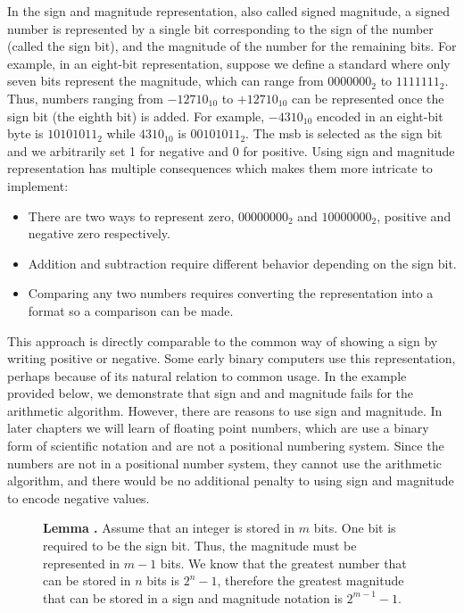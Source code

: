 \documentclass[letterpaper, 12pt]{book}
\newcommand*{\lemma}[1]{\noindent
    \colorbox{green!10}{\noindent
        \begin{minipage}{\textwidth}
            \textbf{Lemma \thechapter.\arabic{examples}}\stepcounter{lemma}
            #1
        \end{minipage}
    }
}
\begin{document}
In the \gls{sign and magnitude} representation, also called signed magnitude, a signed number is represented by a single bit 
corresponding to the sign of the number (called the sign bit), and the \gls{magnitude} of the number for the remaining %
bits. For example, in an eight-bit representation, suppose we define a standard where only seven bits represent the magnitude, 
which can range from $0000000_2$ to $1111111_2$. Thus, numbers ranging from $-12710_{10}$ to $+12710_{10}$ can be represented 
once the sign bit (the eighth bit) is added. For example, $-4310_{10}$ encoded in an eight-bit byte is $10101011_2$ while 
$4310_{10}$ is $00101011_2$. The \gls{msb} is selected as the sign bit and we arbitrarily set 1 for negative and 0 for 
positive. Using sign and magnitude representation has multiple consequences which makes them more intricate to implement:

\begin{itemize}
    \item There are two ways to represent zero, $00000000_2$ and $10000000_2$, positive and negative zero respectively.
    \item Addition and subtraction require different behavior depending on the sign bit.
    \item Comparing any two numbers requires converting the representation into a format so a comparison can be made.
\end{itemize}

This approach is directly comparable to the common way of showing a sign by writing positive or negative. Some early 
binary computers use this representation, perhaps because of its natural relation to common usage. In the example 
provided below, we demonstrate that sign and and magnitude fails for the arithmetic algorithm.%
%
However, there are reasons to use sign and magnitude. In later chapters we will learn of \glspl{floating point number}, which 
are use a binary form of scientific notation %
 and are not a positional numbering system. Since the numbers are not in a positional number system, they cannot 
 use the arithmetic algorithm, and there would be no additional penalty to using sign and magnitude to encode 
negative values. 

\begin{figure}[ht]
    \lemma{%
        Assume that an integer is stored in $m$ bits. One bit is required to be the sign bit. Thus, the magnitude %
        must be represented in $m - 1$ bits. We know that the greatest number that can be stored in $n$ bits is %
        $2^{n}-1$, therefore the greatest magnitude that can be stored in a sign and magnitude notation is $2^{m-1}-1$.%
    }
\end{figure}
\end{document}
